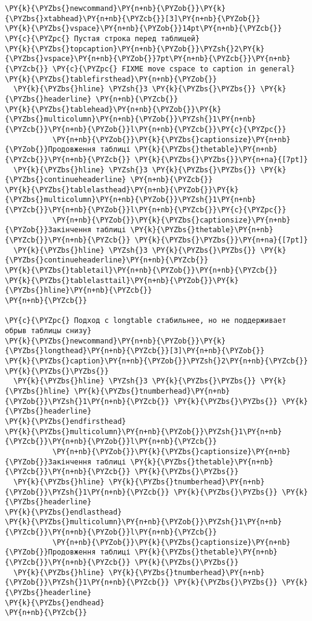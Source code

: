 \begin{Verbatim}[commandchars=\\\{\}]
\PY{k}{\PYZbs{}newcommand}\PY{n+nb}{\PYZob{}}\PY{k}{\PYZbs{}xtabhead}\PY{n+nb}{\PYZcb{}}[3]\PY{n+nb}{\PYZob{}}
\PY{k}{\PYZbs{}vspace}\PY{n+nb}{\PYZob{}}14pt\PY{n+nb}{\PYZcb{}} \PY{c}{\PYZpc{} Пустая строка перед таблицей}
\PY{k}{\PYZbs{}topcaption}\PY{n+nb}{\PYZob{}}\PYZsh{}2\PY{k}{\PYZbs{}vspace}\PY{n+nb}{\PYZob{}}7pt\PY{n+nb}{\PYZcb{}}\PY{n+nb}{\PYZcb{}} \PY{c}{\PYZpc{} FIXME move cspace to caption in general}
\PY{k}{\PYZbs{}tablefirsthead}\PY{n+nb}{\PYZob{}}
  \PY{k}{\PYZbs{}hline} \PYZsh{}3 \PY{k}{\PYZbs{}\PYZbs{}} \PY{k}{\PYZbs{}headerline} \PY{n+nb}{\PYZcb{}}
\PY{k}{\PYZbs{}tablehead}\PY{n+nb}{\PYZob{}}\PY{k}{\PYZbs{}multicolumn}\PY{n+nb}{\PYZob{}}\PYZsh{}1\PY{n+nb}{\PYZcb{}}\PY{n+nb}{\PYZob{}}l\PY{n+nb}{\PYZcb{}}\PY{c}{\PYZpc{}}
           \PY{n+nb}{\PYZob{}}\PY{k}{\PYZbs{}captionsize}\PY{n+nb}{\PYZob{}}Продовження таблиці \PY{k}{\PYZbs{}thetable}\PY{n+nb}{\PYZcb{}}\PY{n+nb}{\PYZcb{}} \PY{k}{\PYZbs{}\PYZbs{}}\PY{n+na}{[7pt]}
  \PY{k}{\PYZbs{}hline} \PYZsh{}3 \PY{k}{\PYZbs{}\PYZbs{}} \PY{k}{\PYZbs{}continueheaderline} \PY{n+nb}{\PYZcb{}}
\PY{k}{\PYZbs{}tablelasthead}\PY{n+nb}{\PYZob{}}\PY{k}{\PYZbs{}multicolumn}\PY{n+nb}{\PYZob{}}\PYZsh{}1\PY{n+nb}{\PYZcb{}}\PY{n+nb}{\PYZob{}}l\PY{n+nb}{\PYZcb{}}\PY{c}{\PYZpc{}}
           \PY{n+nb}{\PYZob{}}\PY{k}{\PYZbs{}captionsize}\PY{n+nb}{\PYZob{}}Закінчення таблиці \PY{k}{\PYZbs{}thetable}\PY{n+nb}{\PYZcb{}}\PY{n+nb}{\PYZcb{}} \PY{k}{\PYZbs{}\PYZbs{}}\PY{n+na}{[7pt]}
  \PY{k}{\PYZbs{}hline} \PYZsh{}3 \PY{k}{\PYZbs{}\PYZbs{}} \PY{k}{\PYZbs{}continueheaderline}\PY{n+nb}{\PYZcb{}}
\PY{k}{\PYZbs{}tabletail}\PY{n+nb}{\PYZob{}}\PY{n+nb}{\PYZcb{}}
\PY{k}{\PYZbs{}tablelasttail}\PY{n+nb}{\PYZob{}}\PY{k}{\PYZbs{}hline}\PY{n+nb}{\PYZcb{}}
\PY{n+nb}{\PYZcb{}}

\PY{c}{\PYZpc{} Подход с longtable стабильнее, но не поддерживает обрыв таблицы снизу}
\PY{k}{\PYZbs{}newcommand}\PY{n+nb}{\PYZob{}}\PY{k}{\PYZbs{}longthead}\PY{n+nb}{\PYZcb{}}[3]\PY{n+nb}{\PYZob{}}
\PY{k}{\PYZbs{}caption}\PY{n+nb}{\PYZob{}}\PYZsh{}2\PY{n+nb}{\PYZcb{}} \PY{k}{\PYZbs{}\PYZbs{}} 
  \PY{k}{\PYZbs{}hline} \PYZsh{}3 \PY{k}{\PYZbs{}\PYZbs{}} \PY{k}{\PYZbs{}hline} \PY{k}{\PYZbs{}tnumberhead}\PY{n+nb}{\PYZob{}}\PYZsh{}1\PY{n+nb}{\PYZcb{}} \PY{k}{\PYZbs{}\PYZbs{}} \PY{k}{\PYZbs{}headerline}
\PY{k}{\PYZbs{}endfirsthead}
\PY{k}{\PYZbs{}multicolumn}\PY{n+nb}{\PYZob{}}\PYZsh{}1\PY{n+nb}{\PYZcb{}}\PY{n+nb}{\PYZob{}}l\PY{n+nb}{\PYZcb{}}
           \PY{n+nb}{\PYZob{}}\PY{k}{\PYZbs{}captionsize}\PY{n+nb}{\PYZob{}}Закінчення таблиці \PY{k}{\PYZbs{}thetable}\PY{n+nb}{\PYZcb{}}\PY{n+nb}{\PYZcb{}} \PY{k}{\PYZbs{}\PYZbs{}}
  \PY{k}{\PYZbs{}hline} \PY{k}{\PYZbs{}tnumberhead}\PY{n+nb}{\PYZob{}}\PYZsh{}1\PY{n+nb}{\PYZcb{}} \PY{k}{\PYZbs{}\PYZbs{}} \PY{k}{\PYZbs{}headerline}
\PY{k}{\PYZbs{}endlasthead}
\PY{k}{\PYZbs{}multicolumn}\PY{n+nb}{\PYZob{}}\PYZsh{}1\PY{n+nb}{\PYZcb{}}\PY{n+nb}{\PYZob{}}l\PY{n+nb}{\PYZcb{}}
           \PY{n+nb}{\PYZob{}}\PY{k}{\PYZbs{}captionsize}\PY{n+nb}{\PYZob{}}Продовження таблиці \PY{k}{\PYZbs{}thetable}\PY{n+nb}{\PYZcb{}}\PY{n+nb}{\PYZcb{}} \PY{k}{\PYZbs{}\PYZbs{}}
  \PY{k}{\PYZbs{}hline} \PY{k}{\PYZbs{}tnumberhead}\PY{n+nb}{\PYZob{}}\PYZsh{}1\PY{n+nb}{\PYZcb{}} \PY{k}{\PYZbs{}\PYZbs{}} \PY{k}{\PYZbs{}headerline}
\PY{k}{\PYZbs{}endhead}
\PY{n+nb}{\PYZcb{}}



\end{Verbatim}
